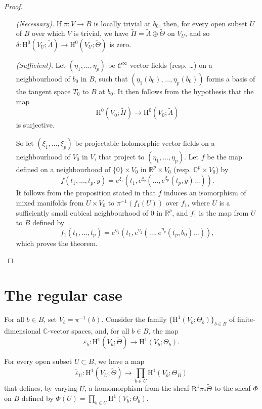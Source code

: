 \documentclass{article}
\newcommand{\RR}{\mathbb{R}}
\newcommand{\CC}{\mathbb{C}}
\newcommand{\HH}{\mathrm{H}}
\newcommand{\oldpage}[1]{\marginpar{\footnotesize$\Big\vert$ \textit{p.~#1}}}
\begin{document}
\begin{proof}
  \phantom{.}
  \begin{itemize}
    \item[\emph{(Necessary).}]
      If $\pi\colon V\to B$ is locally trivial at $b_0$, then, for every open subset $U$ of $B$ over which $V$ is trivial, we have $\widetilde{\Pi}=\widetilde{\Lambda}\oplus\widetilde{\Theta}$ on $V_U$, and so $\delta\colon\HH^0(V_U;\widetilde{\Lambda})\to\HH^0(V_U;\widetilde{\Theta})$ is zero.
    \item[\emph{(Sufficient).}]
      Let $(\eta_1,\ldots,\eta_p)$ be $\mathscr{C}^\infty$ vector fields (resp. \ldots) on a neighbourhood of $b_0$ in $B$, such that $(\eta_1(b_0),\ldots,\eta_p(b_0))$ forms a basis of the tangent space $T_0$ to $B$ at $b_0$.
      It then follows from the hypothesis that the map
      \[
        \HH^0(V_0;\widetilde{\Pi}) \to \HH^0(V_0;\widetilde{\Lambda})
      \]
      is surjective.

      So let $(\xi_1,\ldots,\xi_p)$ be projectable holomorphic vector fields on a neighbourhood of $V_0$ in $V$, that project to $(\eta_1,\ldots,\eta_p)$.
      Let $f$ be the map defined on a neighbourhood of $\{0\}\times V_0$ in $\RR^p\times V_0$ (resp. $\CC^p\times V_0$) by
      \[
        f(t_1,\ldots,t_p,y) = e^{\xi_1}(t_1,e^{\xi_2}(\ldots,e^{\xi_p}(t_p,y)\ldots)).
      \]
      It follows from the proposition stated in \cite[\S III.2]{1} that $f$ induces an isomorphism of mixed manifolds from $U\times V_0$ to $\pi^{-1}(f_1(U))$ over $f_1$, where $U$ is a sufficiently small cubical neighbourhood of $0$ in $\RR^p$, and $f_1$ is the map from $U$ to $B$ defined by
      \[
        f_1(t_1,\ldots,t_p) = e^{\eta_1}(t_1,e^{\eta_2}(\ldots,e^{\eta_p}(t_p,b_0)\ldots)),
      \]
\oldpage{3-03}
      which proves the theorem.
  \end{itemize}
\end{proof}


\section{The regular case}
\label{II}

For all $b\in B$, set $V_b=\pi^{-1}(b)$.
Consider the family $\{\HH^1(V_b;\Theta_b)\}_{b\in B}$ of finite-dimensional $\CC$-vector spaces, and, for all $b\in B$,  the map
\[
  \varepsilon_b\colon \HH^1(V_b;\widetilde{\Theta}) \to \HH^1(V_b;\Theta_b).
\]

For every open subset $U\subset B$, we have a map
\[
  \widetilde{\varepsilon}_U\colon \HH^1(V_U;\widetilde{\Theta}) \to \prod_{b\in U}\HH^1(V_b;\Theta_B)
\]
that defines, by varying $U$, a homomorphism from the sheaf $\mathrm{R}^1\pi_*\widetilde{\Theta}$ to the sheaf $\Phi$ on $B$ defined by $\Phi(U)=\prod_{b\in U}\HH^1(V_b;\Theta_b)$.
\end{document}
